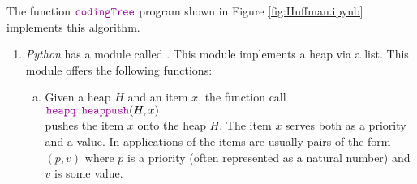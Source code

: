 \noindent
The function $\mytt{codingTree}$ program shown in Figure \ref{fig:Huffman.ipynb} implements this algorithm.
\begin{enumerate}
\item \textsl{Python} has a module called .  This module implements a heap via a list.
      This module offers the following functions:
      \begin{enumerate}[(a)]
      \item Given a heap $H$ and an item $x$, the function call
            \\[0.2cm]
            \hspace*{1.3cm}
            $\mytt{heapq.heappush}(H, x)$
            \\[0.2cm]
            pushes the item $x$ onto the heap $H$.  The item $x$ serves both as a priority and a value.
            In applications of  the items are usually pairs of the form $(p, v)$ where $p$ is a
            priority (often represented as a natural number) and $v$ is some value.


\end{enumerate}
\end{enumerate}
